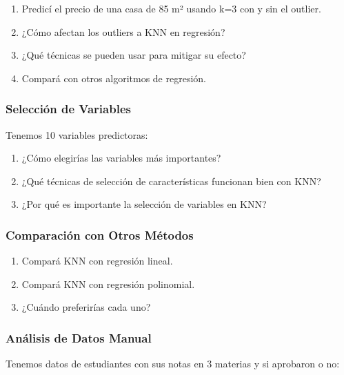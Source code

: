 \documentclass[12pt]{article}
\begin{document}
\begin{enumerate}
    \item Predicí el precio de una casa de 85 m² usando k=3 con y sin el outlier.
    \item ¿Cómo afectan los outliers a KNN en regresión?
    \item ¿Qué técnicas se pueden usar para mitigar su efecto?
    \item Compará con otros algoritmos de regresión.
\end{enumerate}

\subsubsection{Selección de Variables}

Tenemos 10 variables predictoras:

\begin{enumerate}
    \item ¿Cómo elegirías las variables más importantes?
    \item ¿Qué técnicas de selección de características funcionan bien con KNN?
    \item ¿Por qué es importante la selección de variables en KNN?
\end{enumerate}


\subsubsection{Comparación con Otros Métodos}

\begin{enumerate}
    \item Compará KNN con regresión lineal.
    \item Compará KNN con regresión polinomial.
    \item ¿Cuándo preferirías cada uno?
\end{enumerate}


\subsubsection{Análisis de Datos Manual}

Tenemos datos de estudiantes con sus notas en 3 materias y si aprobaron o no:
\end{document}
